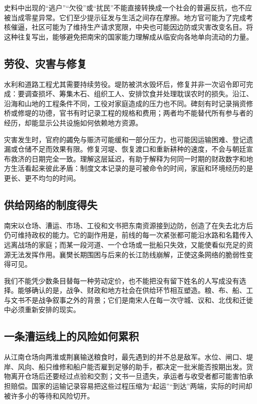 史料中出现的“逃户”“欠役”或“扰民”不能直接转换成一个社会的普遍反抗，也不应被当成零星异常。它们至少提示征发与生活之间存在摩擦。地方官可能为了完成考核催逼，社区可能为了维持生产请求宽限，中央也可能因边防或灾害改变名目。将这种往复写出，能够避免把南宋的国家能力理解成从临安向各地单向流动的力量。

\subsection{劳役、灾害与修复}

水利和道路工程尤其需要持续劳役。堤防被洪水毁坏后，修复并非一次诏令即可完成：要调查损坏、筹集木石、组织工人、安排饮食并处理耽误农时的损失。沿江、沿海和山地的工程条件不同，工役对家庭造成的压力也不同。碑刻有时记录捐资修桥或修堤的功德，官书有时记录工程的规格和费用；两者均不能替代所有参与者的经历，却能显示公共设施如何依赖地方资源。

灾害发生时，官府的蠲免与赈济可能缓和一部分压力，也可能因运输困难、登记遗漏或仓储不足而效果有限。修复河堤、恢复渡口和重新耕种的速度，不会与朝廷宣布救济的日期完全一致。理解这层延迟，有助于解释为何同一时期的财政数字和地方生活看起来彼此矛盾：制度文本记录的是可被命令的时间，家庭和环境经历的是更长、更不均匀的时间。

\subsection{供给网络的制度得失}

南宋以仓场、漕运、市场、工役和文书把东南资源接到边防，创造了在失去北方后仍可维持政权的能力。它的副作用是，前线的每一次紧张都可能沿水路和名籍传入远离战场的家庭；而某一段河道、一个仓场或一批船只失效，又能使看似充足的资源无法发挥作用。襄樊长期围困与后来的长江防线崩解，正使这条网络的脆弱性变得可见。

我们不能凭少数条目替每一种劳动定价，也不能把没有留下姓名的人写成没有选择。能够确认的是，战争、财政和地方社会在供给环节相互塑造。粮、布、船、工与文书不是战争叙事之外的背景；它们是南宋人在每一次守城、议和、北伐和迁徙中必须重新安排的现实。

\subsection{一条漕运线上的风险如何累积}

从江南仓场向两淮或荆襄输送粮食时，最先遇到的并不总是敌军。水位、闸口、堤岸、风向、船只维修和船户能否雇到足够的助手，都决定一批米能否按期出发。货物离开仓场后还要经过点验和交割；文书一旦遗失，承运者与收受者都可能害怕承担赔偿。国家的运输记录容易把这些过程压缩为“起运”“到达”两端，实际的时间却被许多小的等待和风险切开。


